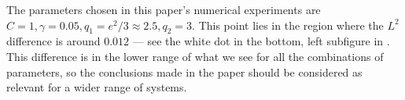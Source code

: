 \documentclass[main.tex]{subfiles}
\begin{document}
The parameters chosen in this paper's numerical experiments
are $C=1,\gamma=0.05,q_1=e^2/3\approx2.5,q_2=3$. This point lies
in the region where the $L^2$ difference is around $0.012$ --- see the
white dot in the
bottom, left subfigure in .
This difference is in the lower range of what we see for all the
combinations of parameters, so the conclusions made in the paper
should be considered as relevant for a wider range of systems.

\biblio
\end{document}
